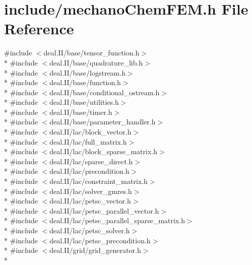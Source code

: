 \section{include/mechano\-Chem\-F\-E\-M.h File Reference}
\label{mechano_chem_f_e_m_8h}
{\ttfamily \#include $<$deal.\-I\-I/base/tensor\-\_\-function.\-h$>$}\\*
{\ttfamily \#include $<$deal.\-I\-I/base/quadrature\-\_\-lib.\-h$>$}\\*
{\ttfamily \#include $<$deal.\-I\-I/base/logstream.\-h$>$}\\*
{\ttfamily \#include $<$deal.\-I\-I/base/function.\-h$>$}\\*
{\ttfamily \#include $<$deal.\-I\-I/base/conditional\-\_\-ostream.\-h$>$}\\*
{\ttfamily \#include $<$deal.\-I\-I/base/utilities.\-h$>$}\\*
{\ttfamily \#include $<$deal.\-I\-I/base/timer.\-h$>$}\\*
{\ttfamily \#include $<$deal.\-I\-I/base/parameter\-\_\-handler.\-h$>$}\\*
{\ttfamily \#include $<$deal.\-I\-I/lac/block\-\_\-vector.\-h$>$}\\*
{\ttfamily \#include $<$deal.\-I\-I/lac/full\-\_\-matrix.\-h$>$}\\*
{\ttfamily \#include $<$deal.\-I\-I/lac/block\-\_\-sparse\-\_\-matrix.\-h$>$}\\*
{\ttfamily \#include $<$deal.\-I\-I/lac/sparse\-\_\-direct.\-h$>$}\\*
{\ttfamily \#include $<$deal.\-I\-I/lac/precondition.\-h$>$}\\*
{\ttfamily \#include $<$deal.\-I\-I/lac/constraint\-\_\-matrix.\-h$>$}\\*
{\ttfamily \#include $<$deal.\-I\-I/lac/solver\-\_\-gmres.\-h$>$}\\*
{\ttfamily \#include $<$deal.\-I\-I/lac/petsc\-\_\-vector.\-h$>$}\\*
{\ttfamily \#include $<$deal.\-I\-I/lac/petsc\-\_\-parallel\-\_\-vector.\-h$>$}\\*
{\ttfamily \#include $<$deal.\-I\-I/lac/petsc\-\_\-parallel\-\_\-sparse\-\_\-matrix.\-h$>$}\\*
{\ttfamily \#include $<$deal.\-I\-I/lac/petsc\-\_\-solver.\-h$>$}\\*
{\ttfamily \#include $<$deal.\-I\-I/lac/petsc\-\_\-precondition.\-h$>$}\\*
{\ttfamily \#include $<$deal.\-I\-I/grid/grid\-\_\-generator.\-h$>$}\\*
